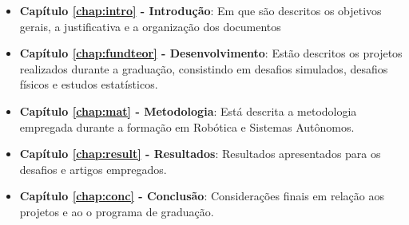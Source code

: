\begin{itemize}

  \item \textbf{Capítulo \ref{chap:intro} - Introdução}: Em que são descritos os objetivos gerais, a justificativa e a organização dos documentos
  \item \textbf{Capítulo \ref{chap:fundteor} - Desenvolvimento}: Estão descritos os projetos realizados durante a graduação, consistindo em desafios simulados, desafios físicos e estudos estatísticos.
  \item \textbf{Capítulo \ref{chap:mat} - Metodologia}: Está descrita a metodologia empregada durante a formação em Robótica e Sistemas Autônomos.
  \item \textbf{Capítulo \ref{chap:result} - Resultados}: Resultados apresentados para os desafios e artigos empregados.
  \item \textbf{Capítulo \ref{chap:conc} - Conclusão}: Considerações finais em relação aos projetos e ao o programa de graduação.

\end{itemize}
